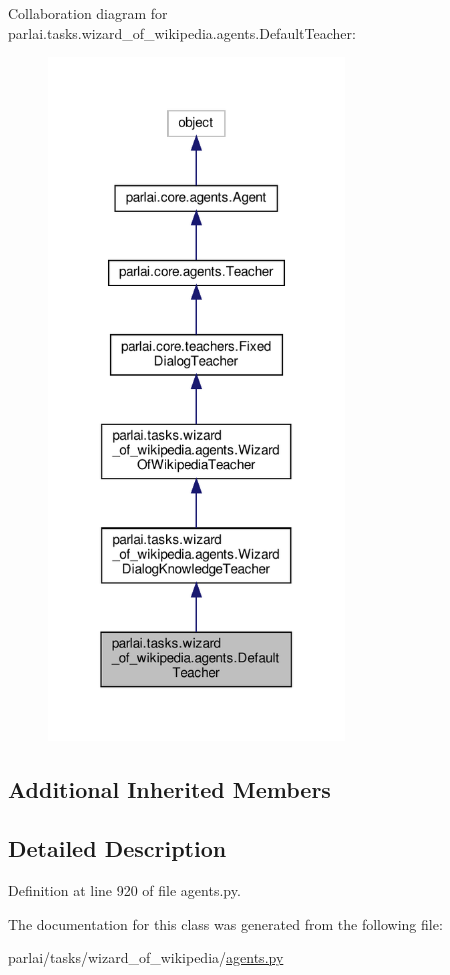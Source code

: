 Collaboration diagram for parlai.\+tasks.\+wizard\+\_\+of\+\_\+wikipedia.\+agents.\+Default\+Teacher\+:\nopagebreak
\begin{figure}[H]
\begin{center}
\leavevmode
\includegraphics[width=223pt]{de/dc7/classparlai_1_1tasks_1_1wizard__of__wikipedia_1_1agents_1_1DefaultTeacher__coll__graph}
\end{center}
\end{figure}
\subsection*{Additional Inherited Members}


\subsection{Detailed Description}


Definition at line 920 of file agents.\+py.



The documentation for this class was generated from the following file\+:\begin{DoxyCompactItemize}
\item 
parlai/tasks/wizard\+\_\+of\+\_\+wikipedia/\hyperlink{parlai_2tasks_2wizard__of__wikipedia_2agents_8py}{agents.\+py}\end{DoxyCompactItemize}
